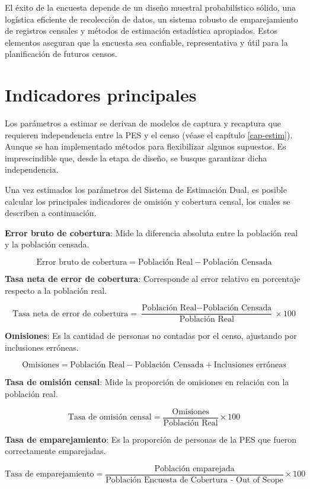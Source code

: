 \documentclass[
  12pt,
]{book}
\begin{document}
El éxito de la encuesta depende de un diseño muestral probabilístico sólido, una logística eficiente de recolección de datos, un sistema robusto de emparejamiento de registros censales y métodos de estimación estadística apropiados. Estos elementos aseguran que la encuesta sea confiable, representativa y útil para la planificación de futuros censos.

\section{Indicadores principales}\label{indicadores-principales}

Los parámetros a estimar se derivan de modelos de captura y recaptura que requieren independencia entre la PES y el censo (véase el capítulo \ref{cap-estim}). Aunque se han implementado métodos para flexibilizar algunos supuestos. Es imprescindible que, desde la etapa de diseño, se busque garantizar dicha independencia.

Una vez estimados los parámetros del Sistema de Estimación Dual, es posible calcular los principales indicadores de omisión y cobertura censal, los cuales se describen a continuación.

\textbf{Error bruto de cobertura}: Mide la diferencia absoluta entre la población real y la población censada.

\[
\text{Error bruto de cobertura} = \text{Población Real} - \text{Población Censada}
\]

\textbf{Tasa neta de error de cobertura}: Corresponde al error relativo en porcentaje respecto a la población real.

\[
\text{Tasa neta de error de cobertura} = \frac{\text{Población Real} - \text{Población Censada}}{\text{Población Real}} \times 100
\]

\textbf{Omisiones}: Es la cantidad de personas no contadas por el censo, ajustando por inclusiones erróneas.

\[
\text{Omisiones} = \text{Población Real} - \text{Población Censada} + \text{Inclusiones erróneas}
\]

\textbf{Tasa de omisión censal}: Mide la proporción de omisiones en relación con la población real.

\[
\text{Tasa de omisión censal} = \frac{\text{Omisiones}}{\text{Población Real}} \times 100
\]

\textbf{Tasa de emparejamiento}: Es la proporción de personas de la PES que fueron correctamente emparejadas.

\[
\text{Tasa de emparejamiento} = \frac{\text{Población emparejada}}{\text{Población Encuesta de Cobertura - Out of Scope}} \times 100
\]
\end{document}
